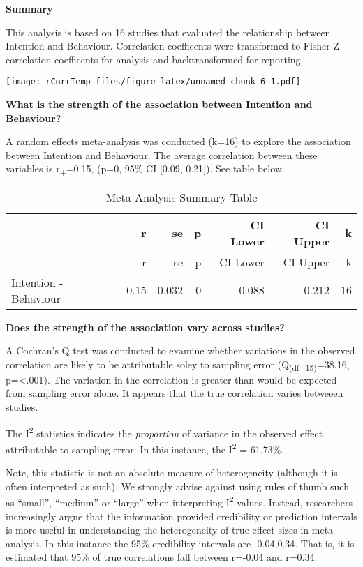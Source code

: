 \documentclass[]{article}
\begin{document}
\textbf{Summary}

This analysis is based on 16 studies that evaluated the relationship
between Intention and Behaviour. Correlation coefficents were
transformed to Fisher Z correlation coefficents for analysis and
backtransformed for reporting.

\texttt{[image: rCorrTemp\_files/figure-latex/unnamed-chunk-6-1.pdf]}

\textbf{What is the strength of the association between Intention and
Behaviour?}

A random effects meta-analysis was conducted (k=16) to explore the
association between Intention and Behaviour. The average correlation
between these variables is r\textsubscript{+}=0.15, (p=0, 95\% CI
{[}0.09, 0.21{]}). See table below.

\begin{longtable}[]{@{}lrrrrrr@{}}
\caption{Meta-Analysis Summary Table}\tabularnewline
\toprule
& r & se & p & CI Lower & CI Upper & k\tabularnewline
\midrule
\endfirsthead
\toprule
& r & se & p & CI Lower & CI Upper & k\tabularnewline
\midrule
\endhead
Intention - Behaviour & 0.15 & 0.032 & 0 & 0.088 & 0.212 &
16\tabularnewline
\bottomrule
\end{longtable}

\textbf{Does the strength of the association vary across studies?}

A Cochran's Q test was conducted to examine whether variations in the
observed correlation are likely to be attributable soley to sampling
error (Q\textsubscript{(df=15)}=38.16, p=\textless{}.001). The variation
in the correlation is greater than would be expected from sampling error
alone. It appears that the true correlation varies betweeen studies.

The I\textsuperscript{2} statistics indicates the \emph{proportion} of
variance in the observed effect attributable to sampling error. In this
instance, the I\textsuperscript{2} = 61.73\%.

Note, this statistic is not an absolute measure of heterogeneity
(although it is often interpreted as such). We strongly advise against
using rules of thumb such as ``small'', ``medium'' or ``large'' when
interpreting I\textsuperscript{2} values. Instead, researchers
increasingly argue that the information provided credibility or
prediction intervals is more useful in understanding the heterogeneity
of true effect sizes in meta-analysis. In this instance the 95\%
credibility intervals are -0.04,0.34. That is, it is estimated that 95\%
of true correlations fall between r=-0.04 and r=0.34.
\end{document}
